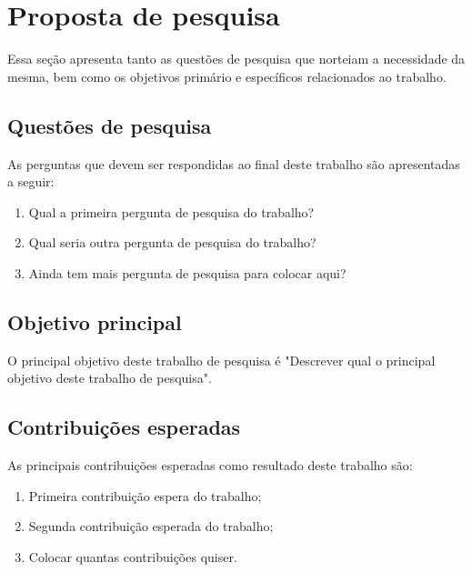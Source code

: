 \chapter{Proposta de pesquisa}\label{cap:proposta_de_pesquisa}

Essa seção apresenta tanto as questões de pesquisa que norteiam a necessidade da mesma, bem como os objetivos primário e específicos relacionados ao trabalho.

\section{Questões de pesquisa} \label{sub:questpesq}

As perguntas que devem %
ser respondidas ao final deste trabalho são apresentadas a seguir:

\begin{enumerate}[leftmargin=*, label=QP\arabic*:]
    \item Qual a primeira pergunta de pesquisa do trabalho?
    \item Qual seria outra pergunta de pesquisa do trabalho?
    \item Ainda tem mais pergunta de pesquisa para colocar aqui?
\end{enumerate}

\section{Objetivo principal}

O principal objetivo deste trabalho de pesquisa é "Descrever qual o principal objetivo deste trabalho de pesquisa".


\section{Contribuições esperadas}
As principais contribuições esperadas como resultado deste trabalho são:

\begin{enumerate}[leftmargin=*, label=CE\arabic*:]
    \item Primeira contribuição espera do trabalho;
    \item Segunda contribuição esperada do trabalho;
    \item Colocar quantas contribuições quiser.
\end{enumerate}
